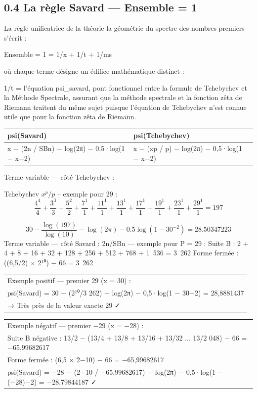 \documentclass[11pt,a4paper]{article}
\begin{document}
\subsection{0.4 La règle Savard — Ensemble = 1}

La règle unificatrice de la théorie la géométrie du spectre des nombres premiers s'écrit :

Ensemble = 1 = 1/x + 1/t + 1/ms

où chaque terme désigne un édifice mathématique distinct :

1/t = l'équation psi\_savard, pont fonctionnel entre la formule de Tchebychev et la Méthode Spectrale, assurant que la méthode spectrale et la fonction zêta de Riemann traitent du même sujet puisque l'équation de Tchebychev n'est connue utile que pour la fonction zêta de Riemann.


\begin{longtable}{|p{}|p{}|}
\hline
psi(Savard) & psi(Tchebychev) \\
\hline
x − (2n / SBn) − log(2π) − 0,5·log(1 − x−2) & x − (xp / p) − log(2π) − 0,5·log(1 − x−2) \\
\hline
\end{longtable}

Terme variable — côté Tchebychev :

Tchebychev $x^p/p$ -- exemple pour 29 :
\[
\frac{4^4}{4} + \frac{3^3}{3} + \frac{5^2}{2} + \frac{7^1}{1} + \frac{11^1}{1} + \frac{13^1}{1} + \frac{17^1}{1} + \frac{19^1}{1} + \frac{23^1}{1} + \frac{29^1}{1} = 197
\]

\[
30 - \frac{\log(197)}{\log(10)} - \log(2\pi) - 0.5\log\left(1 - 30^{-2}\right) = 28.50347223
\]
Terme variable — côté Savard :
2n/SBn — exemple pour P = 29 :
Suite B : 2 + 4 + 8 + 16 + 32 + 128 + 256 + 512 + 768 + 1 536 = 3 262
Forme fermée : ((6,5/2) × 2¹⁰) − 66 = 3 262

\begin{longtable}{|p{}|}
\hline
Exemple positif — premier 29 (x = 30) : \\ psi(Savard) = 30 − (2¹⁰/3 262) − log(2π) − 0,5·log(1 − 30−2) = 28,8881437 \\ → Très près de la valeur exacte 29 ✓ \\
\hline
\end{longtable}

\begin{longtable}{|p{}|}
\hline
Exemple négatif — premier −29 (x = −28) : \\ Suite B négative : 13/2 − (13/4 + 13/8 + 13/16 + 13/32 ... 13/2 048) − 66 = −65,99682617 \\ Forme fermée : (6,5 × 2−10) − 66 = −65,99682617 \\ psi(Savard) = −28 − (2−10 / −65,99682617) − log(2π) − 0,5·log(1 − (−28)−2) = −28,79844187 ✓ \\
\hline
\end{longtable}
\end{document}

